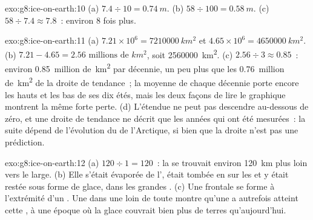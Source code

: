 \begin{solution}{exo:g8:ice-on-earth:10}
(a) $7.4 \div 10 = \qty{0.74}{m}$. (b) $58 \div 100 = \qty{0.58}{m}$.
(c) $58 \div 7.4 \approx 7.8$~: environ 8 fois plus.
\end{solution}

\begin{solution}{exo:g8:ice-on-earth:11}
(a) $7.21 \times 10^6 = \qty{7210000}{km^2}$ et $4.65 \times 10^6 =
\qty{4650000}{km^2}$. (b) $7.21 - 4.65 = \num{2.56}\text{ millions de }\unit{km^2}$, soit
\qty{2560000}{km^2}. (c) $2.56 \div 3 \approx 0.85$~: environ
\num{0.85}~million de~\unit{km^2} par décennie, un peu plus que les
\num{0.76}~million de~\unit{km^2} de la droite de tendance~; la moyenne de
chaque décennie porte encore les hauts et les bas de ses dix étés, mais
les deux façons de lire le graphique montrent la même forte perte. (d)
L'étendue ne peut pas descendre au-dessous de zéro, et une droite de
tendance ne décrit que les années qui ont été mesurées~: la suite dépend
de l'évolution du  de l'Arctique, si bien que la droite n'est pas
une prédiction.
\end{solution}

\begin{solution}{exo:g8:ice-on-earth:12}
(a) $120 \div 1 = 120$~: la  se trouvait environ \qty{120}{km} plus
loin vers le large. (b) Elle s'était évaporée de l', était tombée en
 sur les  et y était restée sous forme de glace, dans les
grandes . (c) Une  frontale se forme à
l'extrémité d'un . Une  dans une  loin de toute
 montre qu'une  a autrefois atteint cette
, à une époque où la glace couvrait bien plus de terres
qu'aujourd'hui.
\end{solution}


